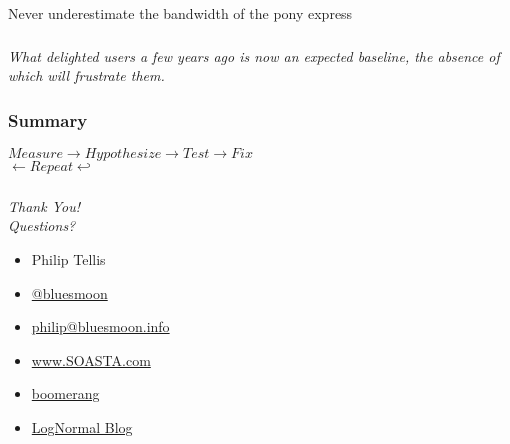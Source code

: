 \documentclass{beamer}
\newcommand{\innersplash}[1]{
  \begin{center}
    \Large \textrm{\textit{ #1 } }
  \end{center}
}
\newcommand{\splashslide}[2][{}]{
  \begin{frame}
  \frametitle{#1}
  \innersplash{#2}
  \end{frame}
}
\begin{document}
\begin{frame}{Never underestimate the bandwidth of the pony express}
\end{frame}

\splashslide{What delighted users a few years ago is now an expected baseline, the absence of which will frustrate them.}

\splashslide[Summary]{$ Measure \rightarrow Hypothesize \rightarrow Test \rightarrow Fix $ \\ $ \leftarrow Repeat \hookleftarrow $}

\splashslide{Thank You! \\ Questions?}

\begin{frame}
  \begin{itemize}
  \item Philip Tellis
  \item \href{http://twitter.com/bluesmoon}{@bluesmoon}
  \item \href{http://bluesmoon.info/}{philip@bluesmoon.info}
  \item \href{http://www.soasta.com/}{www.SOASTA.com}
  \item \href{http://lognormal.github.com/boomerang/doc/}{boomerang}
  \item \href{http://www.lognormal.com/blog/}{LogNormal Blog}
  \end{itemize}
\end{frame}
\end{document}

